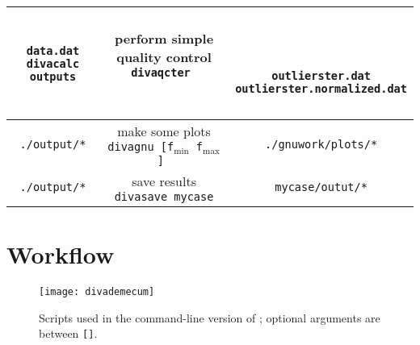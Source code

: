 \begin{table}[H]
{{\begin{tabular}{c|c|c}
{ {\tt data.dat} \\
{\tt divacalc outputs}
}
 & 
\shortstack{
{  { }  } \\
{\sf perform simple quality control} \\
{\tt divaqcter } 
\\
{  { }  } \\
{  { }  } \\
{  { }  }
}
& 
\shortstack{
{  { }  } \\
{  { }  } \\
{  { }  } \\
{{\tt outlierster.dat}} \\
{{\tt outlierster.normalized.dat}} \\
{  { }  } \\
{  { }  } 
} \\ \hline
{\tt ./output/*}  & 
\shortstack{
{\sf make some plots} \\
{\tt divagnu [f$_{\min}$ f$_{\max}$] } 
} & {\tt ./gnuwork/plots/*} \\ \hline
{\tt ./output/*}  & 
\shortstack{
{\sf save results} \\
{\tt divasave mycase} 
}
& {\tt mycase/outut/*} \\ 
\bottomrule
\end{tabular}
}}
\end{table}



\section{Workflow}


\begin{figure}[H]
\centering
\texttt{[image: divademecum]}
\caption[Scripts used in the command-line version of \diva.]{Scripts used in the command-line version of \diva; optional arguments are between {\tt []}.}
\end{figure}




